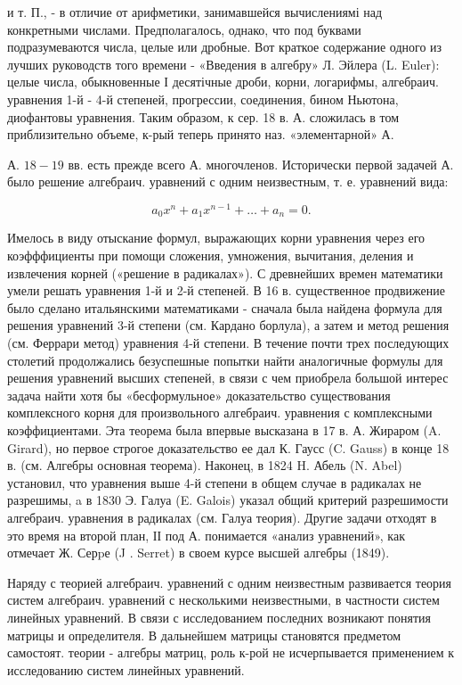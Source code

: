 \documentclass[10pt]{article}
\begin{document}
и т. П., - в отличие от арифметики, занимавшейся вычислениямі над конкретными числами. Предполагалось, однако, что под буквами подразумеваются числа, целые или дробные. Вот краткое содержание одного из лучших руководств того времени - «Введения в алгебру» Л. Эйлера (L. Euler): целые числа, обыкновенные І десятічные дроби, корни, логарифмы, алгебраич. уравнения 1-й - 4-й степеней, прогрессии, соединения, бином Ньютона, диофантовы уравнения. Таким образом, к сер. 18 в. А. сложилась в том приблизительно объеме, к-рый теперь принято наз. «элементарной» А.



А. $18-19$ вв. есть прежде всего А. многочленов. Исторически первой задачей А. было решение алгебраич. уравнений с одним неизвестным, т. е. уравнений вида:



\[

a_{0} x^{n}+a_{1} x^{n-1}+\ldots+a_{n}=0 .

\]



Имелось в виду отыскание формул, выражающих корни уравнения через его коэфффициенты при помощи сложения, умножения, вычитания, деления и извлечения корней («решение в радикалах»). С древнейших времен математики умели решать уравнения 1-й и 2-й степеней. В 16 в. существенное продвижение было сделано итальянскими математиками - сначала была найдена формула для решения уравнений 3-й степени (см. Кардано борлула), а затем и метод решения (см. Феррари метод) уравнения 4-й степени. В течение почти трех последующих столетий продолжались безуспешные попытки найти аналогичные формулы для решения уравнений высших степеней, в связи с чем приобрела большой интерес задача найти хотя бы «бесформульное» доказательство существования комплексного корня для произвольного алгебраич. уравнения с комплексными коэффициентами. Эта теорема была впервые высказана в 17 в. А. Жираром (A. Girard), но первое строгое доказательство ее дал К. Гаусс (C. Gauss) в конце 18 в. (см. Алгебры основная теорема). Наконец, в 1824 H. Абель (N. Abel) установил, что уравнения выше 4-й степени в общем случае в радикалах не разрешимы, a в 1830 Э. Галуа (E. Galois) указал общий критерий разрешимости алгебраич. уравнения в радикалах (см. Галуа теория). Другие задачи отходят в это время на второй план, ІІ под А. понимается «анализ уравнений», как отмечает Ж. Серpе (J . Serret) в своем курсе высшей алгебры (1849).



Наряду с теорией алгебраич. уравнений с одним неизвестным развивается теория систем алгебраич. уравнений с несколькими неизвестными, в частности систем линейных уравнений. В связи с исследованием последних возникают понятия матрицы и определителя. В дальнейшем матрицы становятся предметом самостоят. теории - алгебры матриц, роль к-рой не исчерпывается применением к исследованию систем линейных уравнений.
\end{document}
